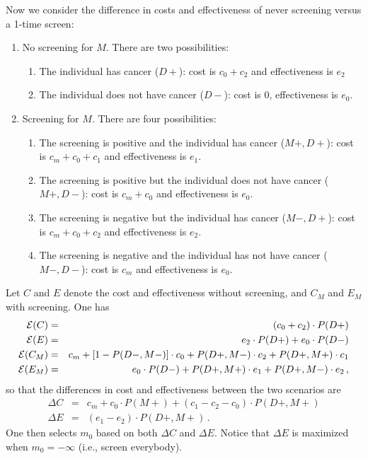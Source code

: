 \documentclass[11pt]{article}
\begin{document}
Now we consider the difference in costs and effectiveness of never screening versus a 1-time screen:
\begin{enumerate}
   \item{No screening for $M$. There are two possibilities:
     \begin{enumerate}
        \item{The individual has cancer ($D+$): cost is $c_0+c_2$ and effectiveness is $e_2$}
        \item{The individual does not have cancer ($D-$): cost is 0, effectiveness is $e_0$.}
     \end{enumerate}
   }
   \item{Screening for $M$. There are four possibilities:
      \begin{enumerate}
        \item{The screening is positive and the individual has cancer ($M+,D+$): cost is $c_m+c_0+c_1$ and effectiveness is $e_1$.}
        \item{The screening is positive but the individual does not have cancer ($M+,D-$): cost is $c_m+c_0$ and effectiveness is $e_0$.}
        \item{The screening is negative but the individual has cancer ($M-,D+$): cost is $c_m+c_0+c_2$ and effectiveness is $e_2$.}
        \item{The screening is negative and the individual has not have cancer ($M-,D-$): cost is $c_m$ and effectiveness is $e_0$.}
      \end{enumerate}  
   }
\end{enumerate}

Let $C$ and $E$ denote the cost and effectiveness without screening, and $C_M$ and $E_M$ with screening. One has
\begin{eqnarray*}
{\cal E} (C) &=& (c_0+c_2)\cdot P(D+) \\
{\cal E} (E) &=& e_2\cdot P(D+) + e_0\cdot P(D-) \\
{\cal E} (C_M) &=& c_m + [1-P(D-,M-)]\cdot c_0+P(D+,M-)\cdot c_2+P(D+,M+)\cdot c_1\\
{\cal E} (E_M) &=& e_0\cdot P(D-) + P(D+,M+)\cdot e_1 + P(D+,M-)\cdot e_2 \,,
\end{eqnarray*}
so that the differences in cost and effectiveness between the two scenarios are 
\begin{eqnarray*}
\Delta C &=& c_m + c_0\cdot P(M+) + (c_1 - c_2 - c_0)\cdot P(D+,M+)\\
\Delta E &=& (e_1 - e_2)\cdot P(D+,M+)\,.
\end{eqnarray*}
One then selects $m_0$ based on both $\Delta C$ and $\Delta E$. Notice that $\Delta E$ is maximized when $m_0=-\infty$ (i.e., screen everybody). 
\end{document}
